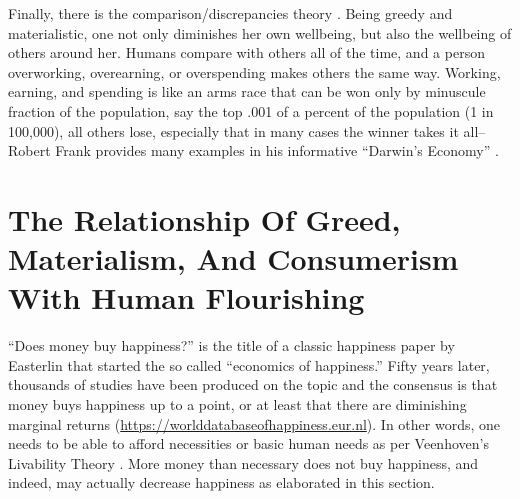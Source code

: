 \documentclass[10pt, letterpaper]{article}
\begin{document}
\begin{spacing}{1.8}
Finally, there is the comparison/discrepancies theory \citep{michalos85}. Being
greedy and  materialistic, one not only diminishes her own wellbeing, but also the
wellbeing of others around her. Humans compare with others all of the time, and
a person overworking, overearning, or overspending makes others the same
way. Working, earning, and spending is like an arms race that can be won only by
minuscule fraction of the population, say the top .001 of a percent of the
population (1 in 100,000), all others lose, especially that in many cases the winner takes it all--Robert Frank provides many examples in his informative ``Darwin's Economy'' \citeyear{frank12}. 

\section{The Relationship Of Greed, Materialism, And Consumerism With  Human Flourishing}


``Does money buy happiness?'' is the title of a classic happiness paper by Easterlin \citeyear{easterlin73} that started the so called ``economics of happiness.'' Fifty
years later, thousands of studies have been produced on the topic and the consensus is that money buys happiness up to a point, or at least that there are diminishing marginal returns (\url{https://worlddatabaseofhappiness.eur.nl}).
%
%
% 
 In other words, one needs to be able to afford necessities or basic human needs as per Veenhoven's Livability Theory \citep{veenhoven14b}. More
 money than necessary does not buy happiness, and indeed, may actually decrease happiness as elaborated in this section.


\end{spacing}
\end{document}
